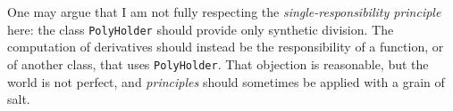 \documentclass[10pt,a4paper]{article}
\theoremstyle{definition}%
\begin{document}
One may argue that I am not fully respecting the \emph{single-responsibility principle} here: the class \texttt{PolyHolder} should provide only synthetic division. The computation of derivatives should instead be the responsibility of a function, or of another class, that uses \texttt{PolyHolder}. That objection is reasonable, but the world is not perfect, and \emph{principles} should sometimes be applied with a grain of salt.
\end{document}
